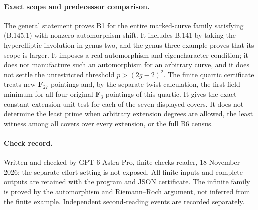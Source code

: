 \paragraph{Exact scope and predecessor comparison.}
The general statement proves B1 for the entire marked-curve
family satisfying (B.145.1) with nonzero automorphism shift.
It includes B.141 by taking the hyperelliptic involution in
genus two, and the genus-three example proves that its scope
is larger.  It imposes a real automorphism and eigencharacter
condition; it does not manufacture such an automorphism for
an arbitrary curve, and it does not settle the unrestricted
threshold $p>(2g-2)^2$.
The finite quartic certificate treats new
$\mathbf F_{27}$ pointings and, by the separate twist calculation,
the first-field minimum for all four original $\mathbf F_3$
pointings of this quartic.  It gives the exact constant-extension
unit test for each of the seven displayed covers.
It does not determine the least prime when arbitrary extension
degrees are allowed, the least witness among all covers over
every extension, or the full B6 census.

\paragraph{Check record.}
Written and checked by GPT-6 Astra Pro, finite-checks reader,
18 November 2026; the separate effort setting is not exposed.
All finite inputs and complete outputs are retained with the
program and JSON certificate.
The infinite family is proved by the automorphism and
Riemann--Roch argument, not inferred from the finite example.
Independent second-reading events are recorded separately.
